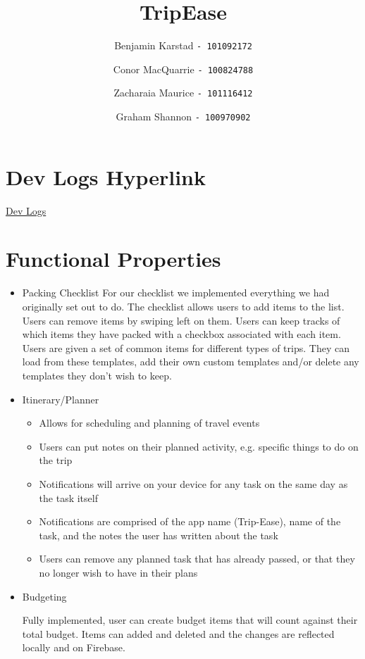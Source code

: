 \documentclass[12pt]{article}
\title{TripEase}
\author{
Benjamin Karstad
\texttt{- 101092172}
\and
Conor MacQuarrie
\texttt{- 100824788}
\and
Zacharaia Maurice
\texttt{- 101116412}
\and
Graham Shannon
\texttt{- 100970902}
}
\begin{document}
	\maketitle

	\section*{Dev Logs Hyperlink}
		\href{https://github.com/theArcticGiant/comp3004-f20/tree/master/app/src/docs/dev logs}{Dev Logs}


	\section*{Functional Properties}

	\begin{itemize}

		\item{Packing Checklist}
		For our checklist we implemented everything we had originally set out to do.
		The checklist allows users to add items to the list. Users can remove items by swiping left on them.
		Users can keep tracks of which items they have packed with a checkbox associated with each item. Users are given a set of common items for different types of trips.
		They can load from these templates, add their own custom templates and/or delete any templates they don't wish to keep.

		\item{Itinerary/Planner}
			\begin{itemize}
				\item Allows for scheduling and planning of travel events
				\item Users can put notes on their planned activity, e.g. specific things to do on the trip
				\item Notifications will arrive on your device for any task on the same day as the task itself
				\item Notifications are comprised of the app name (Trip-Ease), name of the task, and the notes the user has written about the task
				\item Users can remove any planned task that has already passed, or that they no longer wish to have in their plans
			\end{itemize}
		\item{Budgeting}

			Fully implemented, user can create budget items that will count against their total budget.
			Items can added and deleted and the changes are reflected locally and on Firebase.


\end{itemize}
\end{document}
